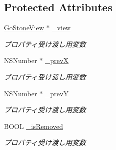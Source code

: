 \subsection*{Protected Attributes}
\begin{DoxyCompactItemize}
\item 
\hypertarget{interface_game_records_a56a4096420569594b9b97b32d9b97eb6}{
\hyperlink{interface_go_stone_view}{GoStoneView} $\ast$ \hyperlink{interface_game_records_a56a4096420569594b9b97b32d9b97eb6}{\_\-view}}
\label{interface_game_records_a56a4096420569594b9b97b32d9b97eb6}

\begin{DoxyCompactList}\small\item\em プロパティ受け渡し用変数 \end{DoxyCompactList}\item 
\hypertarget{interface_game_records_ae44b9e95b767f8f37856f2a9850d3230}{
NSNumber $\ast$ \hyperlink{interface_game_records_ae44b9e95b767f8f37856f2a9850d3230}{\_\-prevX}}
\label{interface_game_records_ae44b9e95b767f8f37856f2a9850d3230}

\begin{DoxyCompactList}\small\item\em プロパティ受け渡し用変数 \end{DoxyCompactList}\item 
\hypertarget{interface_game_records_a6e69938ce77ef8fef142559749b57a69}{
NSNumber $\ast$ \hyperlink{interface_game_records_a6e69938ce77ef8fef142559749b57a69}{\_\-prevY}}
\label{interface_game_records_a6e69938ce77ef8fef142559749b57a69}

\begin{DoxyCompactList}\small\item\em プロパティ受け渡し用変数 \end{DoxyCompactList}\item 
\hypertarget{interface_game_records_ac4e5d6a5f8b55b2f64f4deba9a3d43ea}{
BOOL \hyperlink{interface_game_records_ac4e5d6a5f8b55b2f64f4deba9a3d43ea}{\_\-isRemoved}}
\label{interface_game_records_ac4e5d6a5f8b55b2f64f4deba9a3d43ea}

\begin{DoxyCompactList}\small\item\em プロパティ受け渡し用変数 \end{DoxyCompactList}\end{DoxyCompactItemize}
